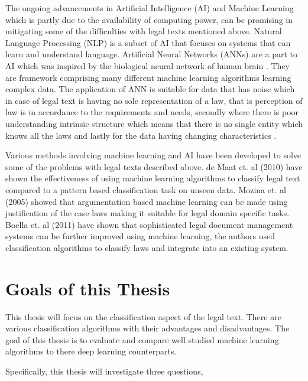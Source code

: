 The ongoing advancements in Artificial Intelligence (AI) and Machine Learning which is partly due to the availability of computing power, can be promising in mitigating some of the difficulties with legal texts mentioned above. Natural Language Processing (NLP) is a subset of AI that focuses on systems that can learn and understand language. Artificial Neural Networks (ANNs) are a part to AI which was inspired by the biological neural network of human brain \cite{van2018artificial}. They are framework comprising many different machine learning algorithms learning complex data. The application of ANN is suitable for data that has noise which in case of legal text is having no sole representation of a law, that is perception of law is in accordance to the requirements and needs, secondly where there is poor understanding intrinsic structure which means that there is no single entity which knows all the laws and lastly for the data having changing characteristics \cite{merkl1997exploration}. 

Various methods involving machine learning and AI have been developed to solve some of the problems with legal texts described above. de Maat et. al (2010) \cite{de2010machine} have shown the effectiveness of using machine learning algorithms to classify legal text compared to a pattern based classification task on unseen data. Mozina et. al (2005) \cite{movzina2005argument} showed that argumentation based machine learning can be made using justification of the case laws making it suitable for legal domain specific tasks. Boella et. al (2011) \cite{boella2011using} have shown that sophisticated legal document management systems can be further improved using machine learning, the authors used classification algorithms to classify laws and integrate into an existing system. 



\section{Goals of this Thesis}
This thesis will focus on the classification aspect of the legal text. There are various classification algorithms with their advantages and disadvantages. The goal of this thesis is to evaluate and compare well studied machine learning algorithms to there deep learning counterparts. 

Specifically, this thesis will investigate three questions,

